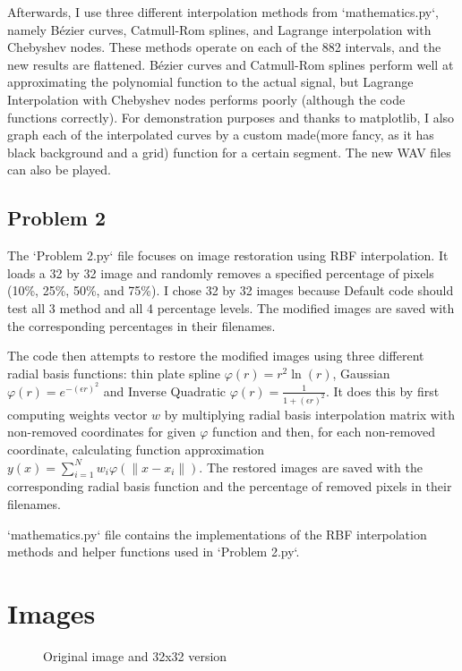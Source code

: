 \documentclass{article}
\begin{document}
	Afterwards, I use three different interpolation methods from `mathematics.py`, namely Bézier curves, Catmull-Rom splines, and Lagrange interpolation with Chebyshev nodes. These methods operate on each of the 882 intervals, and the new results are flattened. Bézier curves and Catmull-Rom splines perform well at approximating the polynomial function to the actual signal, but Lagrange Interpolation with Chebyshev nodes performs poorly (although the code functions correctly). For demonstration purposes and thanks to matplotlib, I also graph each of the interpolated curves by a custom made(more fancy, as it has black background and a grid) function for a certain segment. The new WAV files can also be played.
	
	\subsection*{Problem 2}
	
	The `Problem 2.py` file focuses on image restoration using RBF interpolation. It loads a 32 by 32 image and randomly removes a specified percentage of pixels (10\%, 25\%, 50\%, and 75\%). I chose 32 by 32 images because Default code should test all 3 method and all 4 percentage levels. The modified images are saved with the corresponding percentages in their filenames.
	
	The code then attempts to restore the modified images using three different radial basis functions: thin plate spline $\varphi (r) = r^2 \ln (r)$, Gaussian $\varphi (r) = e^{-(\epsilon r)^2}$ and Inverse Quadratic $\varphi (r) = \frac{1}{1 + (\epsilon r)^2}$. It does this by first computing weights vector $w$ by multiplying radial basis interpolation matrix with non-removed coordinates for given $\varphi$ function and then, for each non-removed coordinate, calculating function approximation $y(x) = \sum_{i = 1}^{N} w_i \varphi (\lVert x - x_i \rVert)$. The restored images are saved with the corresponding radial basis function and the percentage of removed pixels in their filenames.
	
	`mathematics.py` file contains the implementations of the RBF interpolation methods and helper functions used in `Problem 2.py`.
		
	\newpage
	
	\section*{Images}
	
	\begin{figure}[h!]
		\centering
		\caption{Original image and 32x32 version}
	\end{figure}
	
\end{document}
